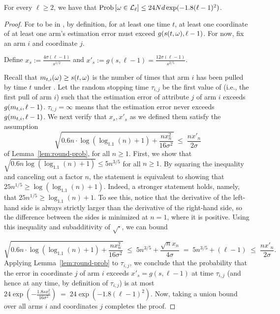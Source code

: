 \begin{lemma} \label{lem:envelope-probability}
For every $\ell \geq 2$, we have that
$\Prob{\SP \in \Env{\ell}} \leq 24 \ARMNUM d\exp(-1.8(\ell-1)^2)$. 
\end{lemma}

\begin{proof}
For \SP to be in \Env{\ell}, by definition,
for at least one time $t$,
at least one coordinate of at least one arm's estimation error must
exceed $g(s(t,\omega),\ell-1)$.
For now, fix an arm $i$ and coordinate $j$.

Define $x_s := \frac{4 \sigma (\ell-1)}{s^{1/2}}$ and
$x'_s := g(s, \ell-1) = \frac{12 \sigma (\ell-1)}{s^{2/5}}$.

Recall that $m_{t,i}(\omega) \geq s(t,\omega)$ is the number of times
that arm $i$ has been pulled by time $t$ under \SP.
Let the random stopping time $\tau_{i,j}$ be the first value of
 (i.e., the first pull of arm $i$) such that 
the estimation error of attribute $j$ of arm $i$ exceeds
$g(m_{t,i}, \ell-1)$.
$\tau_{i,j} = \infty$ means that the estimation error never exceeds 
$g(m_{t,i}, \ell-1)$.
We next verify that $x_s, x'_s$ as we defined them satisfy the 
assumption 
\[
  \sqrt{0.6 n \cdot \log (\log_{1.1}(n) + 1) + \frac{n x_n^2}{16 \sigma^2}}
  \; \leq \; \frac{n x'_n}{2 \sigma}
\]
of Lemma~\ref{lem:round-prob}, for all $n \geq 1$.
First, we show that
$\sqrt{0.6n \log(\log_{1.1}(n)+1)} \leq 5 n^{3/5}$
for all $n \geq 1$.
By squaring the inequality and canceling out a factor $n$,
the statement is equivalent to showing that
$25 n^{1/5} \geq \log(\log_{1.1}(n)+1)$.
Indeed, a stronger statement holds, namely, that
$25 n^{1/5} \geq \log_{1.1}(n)+1$.  
To see this, notice that the derivative of the left-hand side is
always strictly larger than the derivative of the right-hand side,
so the difference between the sides is minimized at $n=1$,
where it is positive. 
Using this inequality and subadditivity of $\sqrt{\cdot}$, we can bound

\[
  \sqrt{0.6 n \cdot \log (\log_{1.1}(n) + 1) + \frac{n x_n^2}{16 \sigma^2}}
\; \leq \;
  5 n^{3/5} + \frac{\sqrt{n} x_n}{4 \sigma}
\; = \; 
  5 n^{3/5} + (\ell-1)
  \; \leq \; \frac{n x'_n}{2 \sigma}.
\]
Applying Lemma~\ref{lem:round-prob} to $\tau_{i,j}$,
we conclude that the probability that the error in coordinate $j$ of
arm $i$ exceeds $x'_s = g(s,\ell-1)$ at time $\tau_{i,j}$
(and hence at any time, by definition of $\tau_{i,j}$)
is at most
$24 \exp\left(-\frac{1.8 s x_s^2}{16 \sigma^2} \right)
\; = \; 24 \exp(-1.8 (\ell-1)^2)$.
Now, taking a union bound over all arms $i$ and
coordinates $j$ completes the proof.
\end{proof}


